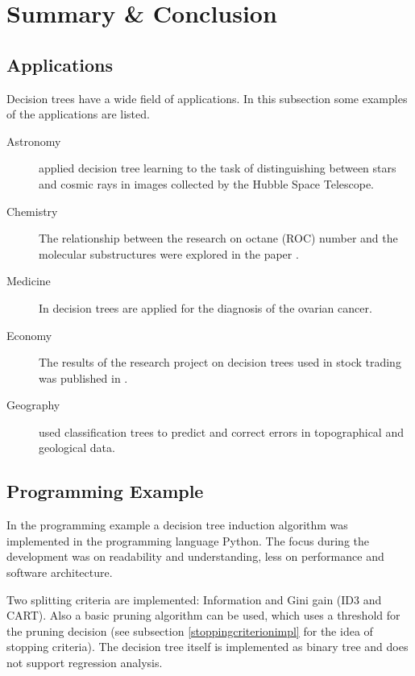 
\newpage


\section{Summary \& Conclusion}

\subsection{Applications}

Decision trees have a wide field of applications. In this subsection some examples of the applications are listed.

\begin{description}
    \item[Astronomy] \cite{salzberg1995decision} applied decision tree learning to the task of distinguishing between stars and cosmic rays in images collected by the Hubble Space Telescope.
    \item[Chemistry] The relationship between the research on octane (ROC) number and the molecular substructures were explored in the paper \cite{blurock1995automatic}.
    \item[Medicine] In \cite{vlahou2003diagnosis} decision trees are applied for the diagnosis of the ovarian cancer.     
    \item[Economy] The results of the research project on decision trees used in stock trading was published in \cite{wu2006effective}.
    \item[Geography] \cite{lagacherie1997addressing} used classification trees to predict and correct errors in topographical and geological data.
\end{description}



\subsection{Programming Example}

In the programming example a decision tree induction algorithm was implemented in the programming language Python. The focus during the development was on readability and understanding, less on performance and software architecture. 

Two splitting criteria are implemented: Information and Gini gain (ID3 and CART). Also a basic pruning algorithm can be used, which uses a threshold for the pruning decision (see subsection \ref{stoppingcriterionimpl} for the idea of stopping criteria). The decision tree itself is implemented as binary tree and does not support regression analysis.


